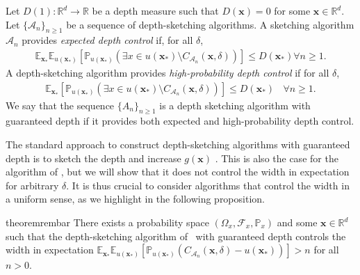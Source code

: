 \begin{definition} \label{def:exp_depth_sketch_alg}
  Let $D(1) : \mathbb{R}^d \rightarrow \mathbb{R}$ be a depth measure such that $D(\bm{x}) = 0$ for some  $\bm{x} \in \mathbb{R}^d$. Let $\{\mathcal{A}_n\}_{n \geq 1}$ be a sequence of depth-sketching algorithms. 
  A sketching algorithm $\mathcal{A}_n$ provides \emph{expected depth control} if, for all $\delta$,
  \begin{align}
    \mathbb{E}_{\bm{x}_*} \mathbb{E}_{u(\bm{x_*})}[\mathbb{P}_{u(\bm{x_*})}(\exists x \in u(\bm{x_*}) \setminus C_{\mathcal{A}_n}(\bm{x},\delta))]  \leq D(\bm{x_*})   \forall n \geq 1.
\end{align}
A depth-sketching algorithm provides \emph{high-probability depth control} if for all $\delta$,
\begin{align}
  \mathbb{E}_{\bm{x}_*}[\mathbb{P}_{u(\bm{x_*})}(\exists x \in u(\bm{x_*}) \setminus C_{\mathcal{A}_n}(\bm{x},\delta))]  \leq D(\bm{x_*})  ~~~~ \forall n \geq 1.
\end{align}
We say that the sequence $\{A_n\}_{n \geq 1}$ is a depth sketching algorithm with guaranteed depth if it provides both expected and high-probability depth control.
\end{definition}

The standard approach to construct depth-sketching algorithms with guaranteed depth is to sketch the depth and increase $g(\bm{x})$ \citep[see, e.g.,][Sec. 5.2]{angelopoulos2024conformal}. This is also the case for the algorithm of  \citet{angelopoulos2024conformal}, but we will show that it does not control the width in expectation for arbitrary $\delta$. It is thus crucial to consider algorithms that control the width in a uniform sense, as we highlight in the following proposition.


\begin{restatable}{theorem}{rembar}\label{prop:rem}
  There exists a probability space $(\Omega_x, \mathcal{F}_x,\mathbb{P}_x)$ and some $\bm{x} \in \mathbb{R}^d$ such that the depth-sketching algorithm of~\cite{angelopoulos2024conformal} with guaranteed depth controls the width in expectation $\mathbb{E}_{\bm{x}_*} \mathbb{E}_{u(\bm{x_*})}[\mathbb{P}_{u(\bm{x_*})}(C_{\mathcal{A}_n}(\bm{x},\delta) - u(\bm{x_*}))] > n$ for all $n > 0.$
\end{restatable}

